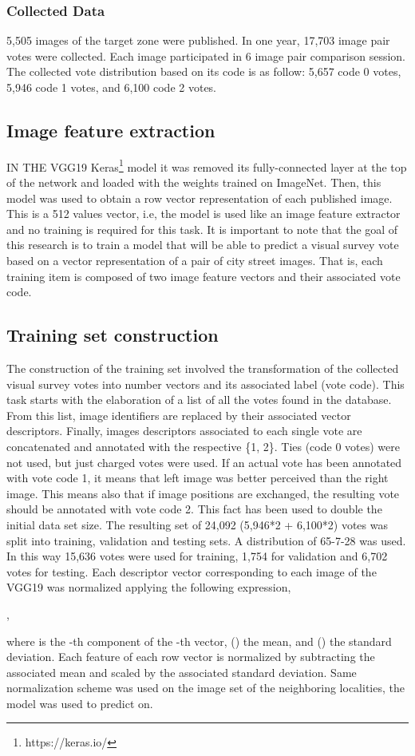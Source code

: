 \documentclass{llncs}
\begin{document}
\subsubsection{Collected Data}
5,505 images of the target zone were published. In one year, 17,703 image pair votes were collected. Each image participated in 6  image pair comparison session. The collected vote distribution based on its code is as follow: 5,657 code 0 votes, 5,946 code 1 votes, and 6,100 code 2 votes. 



\subsection{Image feature extraction} 
IN THE VGG19 Keras\footnote{https://keras.io/} model it was removed its  fully-connected layer at the top of the network and loaded with the weights trained on ImageNet. Then, this model was used to obtain a row vector representation of each published image. This is a 512 values vector, i.e, the model is used like an image feature extractor and no training is required for this task. It is important to note that the goal of this research is to train a model that will be able to predict a visual survey vote based on a vector representation of a pair of city street images. That is, each training item is composed of two image feature vectors and their associated vote code.

\subsection{Training set construction} 
The construction of the training set involved the transformation of the collected visual survey votes into number vectors and its associated label (vote code). This task starts with the elaboration of a list of all the votes found in the database. From this list, image identifiers are replaced by their associated vector descriptors. Finally, images descriptors associated to each single vote are concatenated and annotated with the respective \{1, 2\}. Ties (code 0 votes) were not used, but just charged votes were used. If an actual vote has been annotated with vote code 1, it means that left image was better perceived than the right image. This means also that if image positions are exchanged, the resulting vote should be annotated with vote code 2.  This fact has been used to double the initial data set size. The resulting set of 24,092 (5,946*2 + 6,100*2) votes was split into training, validation and testing sets. A distribution of 65-7-28 was used. In this way 15,636 votes were used for training, 1,754 for validation and 6,702 votes for testing. Each descriptor vector corresponding to each image of the VGG19 was normalized applying the following expression,
\begin{center}
,
\end{center}
where  is the -th component of the -th vector, () the mean, and () the standard deviation. Each feature  of each row vector  is normalized by subtracting the associated mean and scaled by the associated standard deviation. Same normalization scheme was used on the image set of the neighboring localities, the model was used to predict on.
\end{document}
